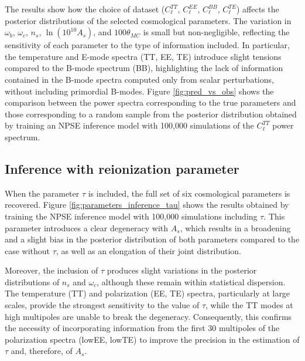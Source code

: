 The results show how the choice of dataset ($C_{\ell}^{TT}$, $C_{\ell}^{EE}$, $C_{\ell}^{BB}$, $C_{\ell}^{TE}$) affects the posterior distributions of the selected cosmological parameters. The variation in $\omega_b$, $\omega_c$, $n_s$, $\ln(10^{10}A_s)$, and $100\theta_{MC}$ is small but non-negligible, reflecting the sensitivity of each parameter to the type of information included. In particular, the temperature and E-mode spectra (TT, EE, TE) introduce slight tensions compared to the B-mode spectrum (BB), highlighting the lack of information contained in the B-mode spectra computed only from scalar perturbations, without including primordial B-modes. Figure \ref{fig:pred_vs_obs} shows the comparison between the power spectra corresponding to the true parameters and those corresponding to a random sample from the posterior distribution obtained by training an NPSE inference model with 100,000 simulations of the $C_{\ell}^{TT}$ power spectrum.  

\subsection{Inference with reionization parameter}
When the parameter $\tau$ is included, the full set of six cosmological parameters is recovered. Figure \ref{fig:parameters_inference_tau} shows the results obtained by training the NPSE inference model with 100,000 simulations including $\tau$. This parameter introduces a clear degeneracy with $A_s$, which results in a broadening and a slight bias in the posterior distribution of both parameters compared to the case without $\tau$, as well as an elongation of their joint distribution.  

Moreover, the inclusion of $\tau$ produces slight variations in the posterior distributions of $n_s$ and $\omega_c$, although these remain within statistical dispersion. The temperature (TT) and polarization (EE, TE) spectra, particularly at large scales, provide the strongest sensitivity to the value of $\tau$, while the TT modes at high multipoles are unable to break the degeneracy. Consequently, this confirms the necessity of incorporating information from the first 30 multipoles of the polarization spectra (lowEE, lowTE) to improve the precision in the estimation of $\tau$ and, therefore, of $A_s$.

